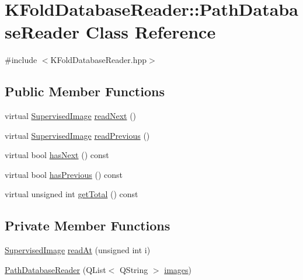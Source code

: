 \hypertarget{class_k_fold_database_reader_1_1_path_database_reader}{\section{K\+Fold\+Database\+Reader\+:\+:Path\+Database\+Reader Class Reference}
\label{class_k_fold_database_reader_1_1_path_database_reader}
}


{\ttfamily \#include $<$K\+Fold\+Database\+Reader.\+hpp$>$}

\subsection*{Public Member Functions}
\begin{DoxyCompactItemize}
\item 
virtual \hyperlink{class_supervised_image}{Supervised\+Image} \hyperlink{class_k_fold_database_reader_1_1_path_database_reader_a3ec743925701640642ef69b1731d21ea}{read\+Next} ()
\item 
virtual \hyperlink{class_supervised_image}{Supervised\+Image} \hyperlink{class_k_fold_database_reader_1_1_path_database_reader_a9f9e600aed16157680c6b4b402e9f764}{read\+Previous} ()
\item 
virtual bool \hyperlink{class_k_fold_database_reader_1_1_path_database_reader_ac6c27452f10e49e7d0d425a56926277c}{has\+Next} () const 
\item 
virtual bool \hyperlink{class_k_fold_database_reader_1_1_path_database_reader_a6f635a1836b5f7dfc23b23ac2ef99cc6}{has\+Previous} () const 
\item 
virtual unsigned int \hyperlink{class_k_fold_database_reader_1_1_path_database_reader_ad92c0ac794e71748a01e7e6f8103342a}{get\+Total} () const 
\end{DoxyCompactItemize}
\subsection*{Private Member Functions}
\begin{DoxyCompactItemize}
\item 
\hyperlink{class_supervised_image}{Supervised\+Image} \hyperlink{class_k_fold_database_reader_1_1_path_database_reader_a929e9feb24e5247e307573ad735c2870}{read\+At} (unsigned int i)
\item 
\hyperlink{class_k_fold_database_reader_1_1_path_database_reader_ac09c594260a18ec32f65a9f8d9daf61b}{Path\+Database\+Reader} (Q\+List$<$ Q\+String $>$ \hyperlink{class_k_fold_database_reader_1_1_path_database_reader_a9b8942b3921fcc44a115fb1d4eb6b49c}{images})
\end{DoxyCompactItemize}
